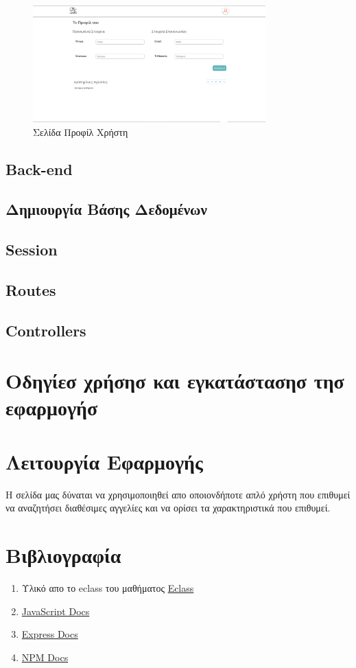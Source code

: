 \documentclass{acmart}
\begin{document}
\begin{figure}[H]
       \includegraphics[width=0.8\textwidth]{profile_page.png}
       \caption{Σελίδα Προφίλ Χρήστη}
       \label{fig:control}
\end{figure}

\subsection{Back-end}
\subsection*{Δημιουργία Βάσης Δεδομένων}

\subsection*{Session}

\subsection*{Routes}


\subsection*{Controllers}

\section{Οδηγίεσ χρήσησ και εγκατάστασησ τησ εφαρμογήσ}

\section{Λειτουργία Εφαρμογής}
Η σελίδα μας δύναται να χρησιμοποιηθεί απο οποιονδήποτε απλό χρήστη που επιθυμεί να αναζητήσει διαθέσιμες αγγελίες και να ορίσει τα χαρακτηριστικά που επιθυμεί.

\section{Βιβλιογραφία}
\begin{enumerate}
       \item Υλικό απο το eclass του μαθήματος \href{https://eclass.upatras.gr/courses/EE767/}{Eclass}
       \item \href{https://developer.mozilla.org/en-US/docs/Web/javascript}{JavaScript Docs}
       \item \href{https://developer.mozilla.org/en-US/docs/Learn/Server-side/Express_Nodejs}{Express Docs}
       \item \href{https://www.npmjs.com/}{NPM Docs}
\end{enumerate}
\end{document}
